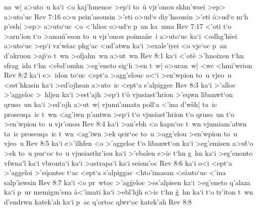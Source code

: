 na~w|
a>uto~u
ka`i
<o
kaj'hmenoc
>ep`i
to~u\r{}
vjr'onou
skhn'wsei
>ep>
a>uto'uc\bibvsend
\vs Rev 7:16
o>u
pein'asousin
>'eti
o>ud`e
diy'hsousin
>'eti
\r{o}>ud`e
m`h
p'esh|
>ep>
a>uto`uc
<o
<'hlioc
o>ud`e
p~an
ka~uma\bibvsend
\vs Rev 7:17
<'oti
t`o
>arn'ion
t`o
>ana\r{m}'eson
to~u
vjr'onou
poima\r{n}e~i
a>uto`uc
ka`i
<odhg'h\r{s}ei
a>uto`uc
>ep`i
vz'w\r{s}ac
phg`ac
<ud'atwn
ka`i
>exale'iyei
<o
vje`oc
p~an
d'akruon
>a\r{p}`o
t~wn
>ofjalm~wn
a>ut~wn\bibvsend
\vs Rev 8:1
ka`i
<'ot\r{e}
>'hnoixen
t`hn
sfrag~ida
t`hn
<ebd'omhn
>eg'eneto
sig`h
>en
t~w|
o>uran~w|
<wc
<hmi'wrion\bibvsend
\vs Rev 8:2
ka`i
e>~idon
to`uc
<ept`a
>agg'elouc
o<`i
>en'wpion
to~u
vjeo~u
<est'hkasin
ka`i
>ed'ojhsan
a>uto~ic
<ept`a
s'alpiggec\bibvsend
\vs Rev 8:3
ka`i
>'alloc
>'aggeloc
>~hljen
ka`i
>est'ajh
>ep`i
t`o\r{}
vjusiast'hrion
>'eqwn
libanwt`on
qruso~un
ka`i
>ed'ojh
a>ut~w|
vjumi'amata
poll`a
<'ina
d'w\r{s}h|
ta~ic
proseuqa~ic
t~wn
<ag'iwn
p'antwn
>ep`i
t`o
vjusiast'hrion
t`o
qruso~un
t`o
>en'wpion
to~u
vjr'onou\bibvsend
\vs Rev 8:4
ka`i
>an'ebh
<o
kapn`oc
t~wn
vjumiam'atwn
ta~ic
proseuqa~ic
t~wn
<ag'iwn
>ek
qeir`oc
to~u
>agg'elou
>en'wpion
to~u
vjeo~u\bibvsend
\vs Rev 8:5
ka`i
e>'ilhfen
<o
>'aggeloc
\r{t}`o
libanwt`on
ka`i
>eg'emisen
a>u\r{t}`o
>ek
to~u
pur`oc
to~u
vjusiasthr'iou
ka`i
>'ebalen
e>ic
t`hn
g~hn
ka`i
>eg'enonto
vfwna`i\r{}
ka`i
vbronta`i
ka`i
>astrapa`i
ka`i
seism'oc\bibvsend
\vs Rev 8:6
ka`i
o<i
<ept`a
>'aggeloi
>'e\r{q}ontec
t`ac
<ept`a
s'alpiggac
<hto'imasan
<e\r{a}uto`uc
<'ina
salp'iswsin\bibvsend
\vs Rev 8:7
ka`i
<o
pr~wtoc
>'ag\r{g}eloc
>es'alpisen
ka`i
>eg'eneto
q'alaza
ka`i
p~ur
memigm'ena
\r{a}<'imati
ka`i
>ebl'hjh
e>ic
t`hn
\r{g}~hn
ka`i
t`o
tr'iton
t~wn
d'endrwn
katek'ah
ka`i
p~ac
q'ortoc
qlwr`oc
katek'ah\bibvsend
\vs Rev 8:8
